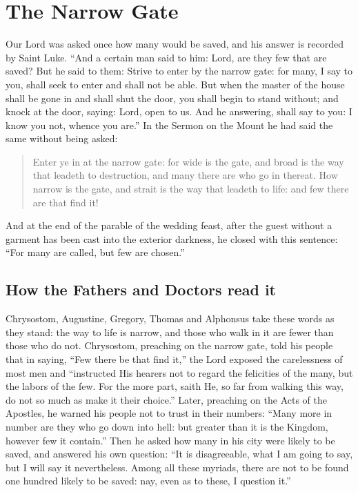 \section{The Narrow Gate}

Our Lord was asked once how many would be saved, and his answer is recorded by Saint Luke. ``And a certain man said to him: Lord, are they few that are saved? But he said to them: Strive to enter by the narrow gate: for many, I say to you, shall seek to enter and shall not be able. But when the master of the house shall be gone in and shall shut the door, you shall begin to stand without; and knock at the door, saying: Lord, open to us. And he answering, shall say to you: I know you not, whence you are.'' In the Sermon on the Mount he had said the same without being asked:

\begin{quote}
Enter ye in at the narrow gate: for wide is the gate, and broad is the way that leadeth to destruction, and many there are who go in thereat. How narrow is the gate, and strait is the way that leadeth to life: and few there are that find it!
\end{quote}

\noindent And at the end of the parable of the wedding feast, after the guest without a garment has been cast into the exterior darkness, he closed with this sentence: ``For many are called, but few are chosen.''

\subsection{How the Fathers and Doctors read it}

Chrysostom, Augustine, Gregory, Thomas and Alphonsus take these words as they stand: the way to life is narrow, and those who walk in it are fewer than those who do not. Chrysostom, preaching on the narrow gate, told his people that in saying, ``Few there be that find it,'' the Lord exposed the carelessness of most men and ``instructed His hearers not to regard the felicities of the many, but the labors of the few. For the more part, saith He, so far from walking this way, do not so much as make it their choice.'' Later, preaching on the Acts of the Apostles, he warned his people not to trust in their numbers: ``Many more in number are they who go down into hell: but greater than it is the Kingdom, however few it contain.'' Then he asked how many in his city were likely to be saved, and answered his own question: ``It is disagreeable, what I am going to say, but I will say it nevertheless. Among all these myriads, there are not to be found one hundred likely to be saved: nay, even as to these, I question it.''

